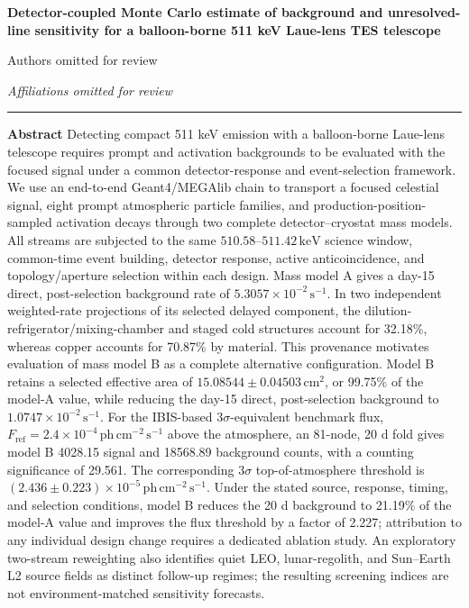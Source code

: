 \documentclass[11pt]{article}
\newcommand{\revblue}[1]{\textcolor{revisionblue}{#1}}
\newcommand{\keV}{\ensuremath{\,\mathrm{keV}}}
\newcommand{\phcms}{\ensuremath{\,\mathrm{ph\,cm^{-2}\,s^{-1}}}}
\newcommand{\cps}{\ensuremath{\,\mathrm{s^{-1}}}}
\newcommand{\fref}{F_{\mathrm{ref}}}
\begin{document}
\thispagestyle{fancy}
\begin{flushleft}
{\LARGE\bfseries Detector-coupled Monte Carlo estimate of background and unresolved-line sensitivity for a balloon-borne 511 keV Laue-lens TES telescope\par}
\vspace{1.1em}
{\large Authors omitted for review\par}
\vspace{0.3em}
{\normalsize\itshape Affiliations omitted for review\par}
\end{flushleft}
\vspace{0.7em}
\noindent\rule{\textwidth}{0.4pt}
\vspace{0.5em}

\noindent\textbf{Abstract}\hspace{0.7em}
Detecting compact 511 keV emission with a balloon-borne Laue-lens telescope
requires prompt and activation backgrounds to be evaluated with the focused
signal under a common detector-response and event-selection framework. We use
an end-to-end Geant4/MEGAlib chain to transport a focused celestial signal,
\revblue{eight prompt atmospheric particle families}, and
production-position-sampled activation decays through two complete
detector--cryostat mass models. All streams are subjected to the same
$510.58$--$511.42\keV$ science window, common-time event building, detector
response, active anticoincidence, and topology/aperture selection within each
design. Mass model A gives a day-15 direct, post-selection background rate of
$5.3057\times10^{-2}\cps$. In two independent weighted-rate projections of its
selected delayed component, the dilution-refrigerator/mixing-chamber and staged
cold structures account for 32.18\%, whereas copper accounts for 70.87\% by
material.
This provenance motivates evaluation of mass model B as a complete alternative
configuration. Model B retains a selected effective area of
$15.08544\pm0.04503\,\mathrm{cm^2}$, or 99.75\% of the model-A value, while
reducing the day-15 direct, post-selection background to $1.0747\times10^{-2}\cps$.
For the IBIS-based $3\sigma$-equivalent benchmark flux,
$\fref=2.4\times10^{-4}\phcms$ above the atmosphere, an 81-node, 20 d fold gives
model B 4028.15 signal and
18568.89 background counts, with a counting significance of 29.561. The
corresponding $3\sigma$ top-of-atmosphere threshold is
$(2.436\pm0.223)\times10^{-5}\phcms$. Under the stated source, response,
timing, and selection conditions, model B reduces the 20 d background to
21.19\% of the model-A value and improves the flux threshold by a
factor of 2.227; attribution to any individual design change requires a
dedicated ablation study.
An exploratory two-stream reweighting also identifies quiet LEO,
lunar-regolith, and Sun--Earth L2 source fields as distinct follow-up regimes;
the resulting screening indices are not environment-matched sensitivity
forecasts.
\end{document}
